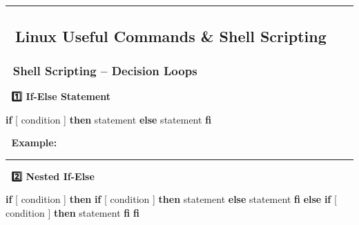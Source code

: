 \documentclass[
]{article}
\newenvironment{Shaded}{}{}
\newcommand{\BuiltInTok}[1]{\textcolor[rgb]{0.00,0.50,0.00}{#1}}
\newcommand{\ControlFlowTok}[1]{\textcolor[rgb]{0.00,0.44,0.13}{\textbf{#1}}}
\newcommand{\ExtensionTok}[1]{#1}
\newcommand{\NormalTok}[1]{#1}
\newcommand{\OtherTok}[1]{\textcolor[rgb]{0.00,0.44,0.13}{#1}}
\newcommand{\StringTok}[1]{\textcolor[rgb]{0.25,0.44,0.63}{#1}}
\newcommand{\VariableTok}[1]{\textcolor[rgb]{0.10,0.09,0.49}{#1}}
\begin{document}
\begin{center}\rule{0.5\linewidth}{0.5pt}\end{center}

\subsection{\texorpdfstring{\textbf{📌 Linux Useful Commands \& Shell
Scripting}}{📌 Linux Useful Commands \& Shell Scripting}}\label{linux-useful-commands-shell-scripting}

\subsubsection{\texorpdfstring{\textbf{🔹 Shell Scripting -- Decision
Loops}}{🔹 Shell Scripting -- Decision Loops}}\label{shell-scripting-decision-loops}

📌 \textbf{1️⃣ If-Else Statement}

\begin{Shaded}
\begin{Highlighting}[]
\ControlFlowTok{if} \BuiltInTok{[}\NormalTok{ condition }\BuiltInTok{]}
\ControlFlowTok{then}
    \ExtensionTok{statement}
\ControlFlowTok{else}
    \ExtensionTok{statement}
\ControlFlowTok{fi}
\end{Highlighting}
\end{Shaded}

📌 \textbf{Example:}

\begin{Shaded}
\end{Shaded}

\begin{center}\rule{0.5\linewidth}{0.5pt}\end{center}

📌 \textbf{2️⃣ Nested If-Else}

\begin{Shaded}
\begin{Highlighting}[]
\ControlFlowTok{if} \BuiltInTok{[}\NormalTok{ condition }\BuiltInTok{]}
\ControlFlowTok{then}
    \ControlFlowTok{if} \BuiltInTok{[}\NormalTok{ condition }\BuiltInTok{]}
    \ControlFlowTok{then}
        \ExtensionTok{statement}
    \ControlFlowTok{else}
        \ExtensionTok{statement}
    \ControlFlowTok{fi}
\ControlFlowTok{else}
    \ControlFlowTok{if} \BuiltInTok{[}\NormalTok{ condition }\BuiltInTok{]}
    \ControlFlowTok{then}
        \ExtensionTok{statement}
    \ControlFlowTok{fi}
\ControlFlowTok{fi}
\end{Highlighting}
\end{Shaded}
\end{document}
